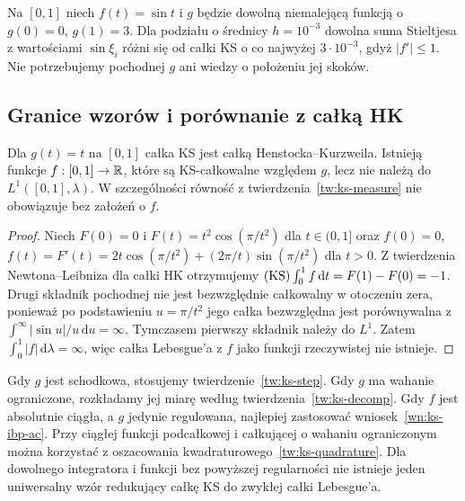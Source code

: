\begin{przyklad}
Na $[0,1]$ niech $f(t)=\sin t$ i $g$ będzie dowolną niemalejącą funkcją o $g(0)=0$, $g(1)=3$. Dla podziału o średnicy $h=10^{-3}$ dowolna suma Stieltjesa z wartościami $\sin\xi_i$ różni się od całki KS o co najwyżej $3\cdot10^{-3}$, gdyż $|f'|\le1$. Nie potrzebujemy pochodnej $g$ ani wiedzy o położeniu jej skoków.
\end{przyklad}

\subsection*{Granice wzorów i porównanie z całką HK}
\begin{stwierdzenie}
Dla $g(t)=t$ na $[0,1]$ całka KS jest całką Henstocka--Kurzweila. Istnieją funkcje $f:[0,1]\to\mathbb R$, które są KS-całkowalne względem $g$, lecz nie należą do $L^1([0,1],\lambda)$. W szczególności równość z twierdzenia~\ref{tw:ks-measure} nie obowiązuje bez założeń o $f$.
\end{stwierdzenie}
\begin{proof}
Niech $F(0)=0$ i $F(t)=t^2\cos(\pi/t^2)$ dla $t\in(0,1]$ oraz $f(0)=0$, $f(t)=F'(t)=2t\cos(\pi/t^2)+(2\pi/t)\sin(\pi/t^2)$ dla $t>0$. Z twierdzenia Newtona--Leibniza dla całki HK otrzymujemy $(\mathrm{KS})\int_0^1 f\,\mathrm dt=F(1)-F(0)=-1$. Drugi składnik pochodnej nie jest bezwzględnie całkowalny w otoczeniu zera, ponieważ po podstawieniu $u=\pi/t^2$ jego całka bezwzględna jest porównywalna z $\int^\infty|\sin u|/u\,\mathrm du=\infty$. Tymczasem pierwszy składnik należy do $L^1$. Zatem $\int_0^1|f|\,\mathrm d\lambda=\infty$, więc całka Lebesgue'a z $f$ jako funkcji rzeczywistej nie istnieje.
\end{proof}

\begin{uwaga}
Gdy $g$ jest schodkowa, stosujemy twierdzenie~\ref{tw:ks-step}. Gdy $g$ ma wahanie ograniczone, rozkładamy jej miarę według twierdzenia~\ref{tw:ks-decomp}. Gdy $f$ jest absolutnie ciągła, a $g$ jedynie regulowana, najlepiej zastosować wniosek~\ref{wn:ks-ibp-ac}. Przy ciągłej funkcji podcałkowej i całkującej o wahaniu ograniczonym można korzystać z oszacowania kwadraturowego~\ref{tw:ks-quadrature}. Dla dowolnego integratora i funkcji bez powyższej regularności nie istnieje jeden uniwersalny wzór redukujący całkę KS do zwykłej całki Lebesgue'a.
\end{uwaga}

